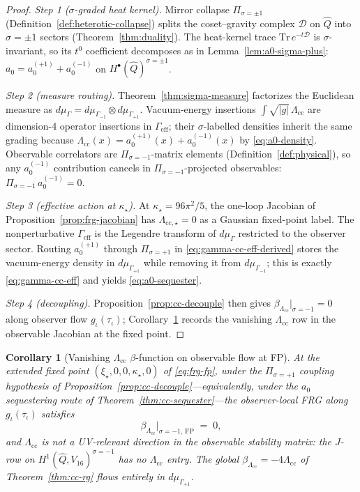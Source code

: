\documentclass[aps,prd,onecolumn,amsmath,amssymb,nofootinbib,11pt]{revtex4-2}
\numberwithin{equation}{section}
\theoremstyle{plain}
\newtheorem{corollary}[theorem]{Corollary}
\theoremstyle{definition}
\theoremstyle{remark}
\begin{document}
\begin{proof}
\emph{Step 1 ($\sigma$-graded heat kernel).}
Mirror collapse $\Pi_{\sigma=\pm1}$
(Definition~\ref{def:heterotic-collapse}) splits the coset--gravity complex
$\mathcal{D}$ on $\hat Q$ into $\sigma=\pm1$ sectors
(Theorem~\ref{thm:duality}). The heat-kernel trace
$\mathrm{Tr}\,e^{-t\mathcal{D}}$ is $\sigma$-invariant, so its $t^0$
coefficient decomposes as in Lemma~\ref{lem:a0-sigma-plus}:
$a_0=a_0^{(+1)}+a_0^{(-1)}$ on
$H^\bullet(\hat Q)^{\sigma=\pm1}$.

\emph{Step 2 (measure routing).}
Theorem~\ref{thm:sigma-measure} factorizes the Euclidean measure as
$d\mu_\Gamma=d\mu_{\Gamma_{-1}}\otimes d\mu_{\Gamma_{+1}}$.
Vacuum-energy insertions $\int\sqrt{|g|}\,\Lambda_{\mathrm{cc}}$ are
dimension-4 operator insertions in $\Gamma_{\mathrm{eff}}$; their
$\sigma$-labelled densities inherit the same grading because
$\Lambda_{\mathrm{cc}}(x)=a_0^{(+1)}(x)+a_0^{(-1)}(x)$ by
\eqref{eq:a0-density}. Observable correlators are $\Pi_{\sigma=-1}$-matrix
elements (Definition~\ref{def:physical}), so any $a_0^{(-1)}$ contribution
cancels in $\Pi_{\sigma=-1}$-projected observables:
$\Pi_{\sigma=-1}\,a_0^{(-1)}=0$.

\emph{Step 3 (effective action at $\kappa_\star$).}
At $\kappa_\star=96\pi^2/5$, the one-loop Jacobian of
Proposition~\ref{prop:frg-jacobian} has
$\Lambda_{\mathrm{cc},\star}=0$ as a Gaussian fixed-point label. The
nonperturbative $\Gamma_{\mathrm{eff}}$ is the Legendre transform of
$d\mu_\Gamma$ restricted to the observer sector. Routing
$a_0^{(+1)}$ through $\Pi_{\sigma=+1}$ in \eqref{eq:gamma-cc-eff-derived}
stores the vacuum-energy density in $d\mu_{\Gamma_{+1}}$ while removing it
from $d\mu_{\Gamma_{-1}}$; this is exactly \eqref{eq:gamma-cc-eff} and
yields \eqref{eq:a0-sequester}.

\emph{Step 4 (decoupling).}
Proposition~\ref{prop:cc-decouple} then gives
$\beta_{\Lambda_{\mathrm{cc}}}|_{\sigma=-1}=0$ along observer flow
$g_\iota(\tau_\iota)$; Corollary~\ref{cor:beta-Lambda-fp} records the
vanishing $\Lambda_{\mathrm{cc}}$ row in the observable Jacobian at the
fixed point.
\end{proof}

\begin{corollary}[Vanishing $\Lambda_{\mathrm{cc}}$ $\beta$-function on observable flow at FP]
\label{cor:beta-Lambda-fp}
At the extended fixed point $(\xi_\star,0,0,\kappa_\star,0)$ of
\eqref{eq:frg-fp}, under the $\Pi_{\sigma=+1}$ coupling hypothesis of
Proposition~\ref{prop:cc-decouple}---equivalently, under the $a_0$
sequestering route of Theorem~\ref{thm:cc-sequester}---the
observer-local FRG along $g_\iota(\tau_\iota)$ satisfies
\begin{equation}\label{eq:beta-Lambda-obs-fp}
  \beta_{\Lambda_{\mathrm{cc}}}\Big|_{\sigma=-1,\,\mathrm{FP}}
  \;=\;
  0,
\end{equation}
and $\Lambda_{\mathrm{cc}}$ is \emph{not} a UV-relevant direction in the
observable stability matrix: the $J$-row on
$H^1(\hat Q,V_{16})^{\sigma=-1}$ has no $\Lambda_{\mathrm{cc}}$ entry. The
global $\beta_{\Lambda_{\mathrm{cc}}}=-4\Lambda_{\mathrm{cc}}$ of
Theorem~\ref{thm:cc-rg} flows entirely in $d\mu_{\Gamma_{+1}}$.
\end{corollary}
\end{document}
